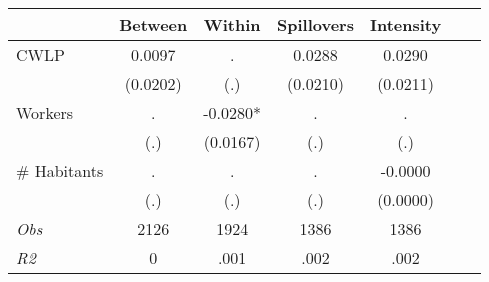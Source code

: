 \begin{tabular}{l*{6}{c}}\hline&\multicolumn{1}{c}{Between}&\multicolumn{1}{c}{Within}&\multicolumn{1}{c}{Spillovers}&\multicolumn{1}{c}{Intensity}\\ \hline 
CWLP & 0.0097 & . & 0.0288 & 0.0290 \\
 & (0.0202) & (.) & (0.0210) & (0.0211) \\
Workers & . & -0.0280* & . & . \\
 & (.) & (0.0167) & (.) & (.) \\
\# Habitants & . & . & . & -0.0000 \\
  & (.) & (.) & (.) & (0.0000) \\
\hline \textit{Obs} & 2126 & 1924 & 1386 & 1386  \\ \textit{R2} & 0 & .001 & .002 & .002 \\ \hline \end{tabular}
